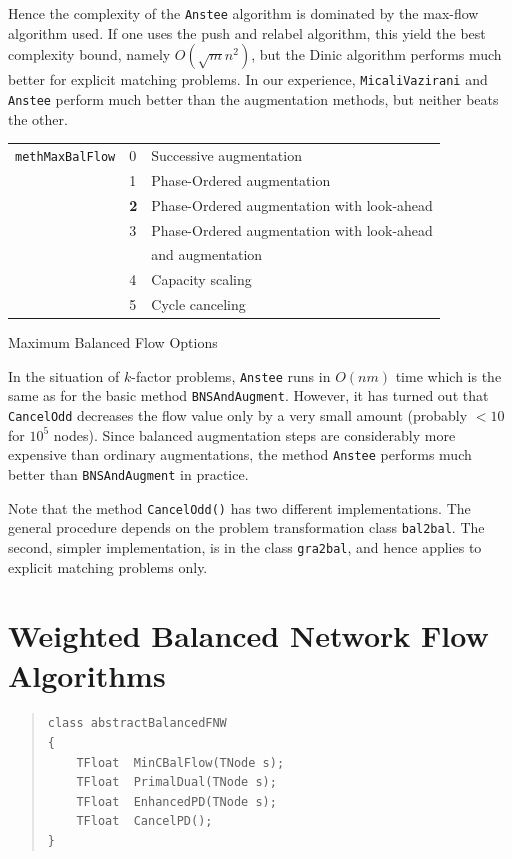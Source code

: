 \documentclass[a4paper,11pt,twoside]{book}
\begin{document}
\begin{multicols}{2}
Hence the complexity of the \verb/Anstee/ algorithm is dominated by the
max-flow algorithm used. If one uses the push and relabel algorithm, this
yield the best complexity bound, namely $O(\sqrt{m}n^2)$, but the Dinic
algorithm performs much better for explicit matching problems. In our
experience, \verb/MicaliVazirani/ and \verb/Anstee/ perform much better than
the augmentation methods, but neither beats the other.

\begin{tablehere}
\begin{center}
\vspace*{1cm}
\begin{tabular}{|l|l|l|}
\hline
\verb/methMaxBalFlow/& 0 & Successive augmentation \\
                    & 1 & Phase-Ordered augmentation \\
                    & {\bf 2} & Phase-Ordered augmentation with look-ahead \\
                    & 3 & Phase-Ordered augmentation with look-ahead \\
                    &   & and augmentation \\
                    & 4 & Capacity scaling \\
                    & 5 & Cycle canceling \\
\hline
\end{tabular}
\end{center}
\caption{\label{tlb706}Maximum Balanced Flow Options}
\end{tablehere}

\noindent
In the situation of $k$-factor problems, \verb/Anstee/ runs in $O(nm)$ time
which is the same as for the basic method \verb/BNSAndAugment/. However, it
has turned out that \verb/CancelOdd/ decreases the flow value only by a very
small amount (probably $<10$ for $10^5$ nodes). Since balanced augmentation
steps are considerably more expensive than ordinary augmentations, the method
\verb/Anstee/ performs much better than \verb/BNSAndAugment/ in practice.

Note that the method \verb/CancelOdd()/ has two different implementations.
The general procedure depends on the problem transformation class
\verb/bal2bal/. The second, simpler implementation, is in the class
\verb/gra2bal/, and hence applies to explicit matching problems only.



\section{Weighted Balanced Network Flow Algorithms}
\label{slb_solve_balanced_weighted}
\methods
\begin{quote}
\begin{verbatim}
class abstractBalancedFNW
{
    TFloat  MinCBalFlow(TNode s);
    TFloat  PrimalDual(TNode s);
    TFloat  EnhancedPD(TNode s);
    TFloat  CancelPD();
}
\end{verbatim}
\end{quote}



\end{multicols}
\end{document}
